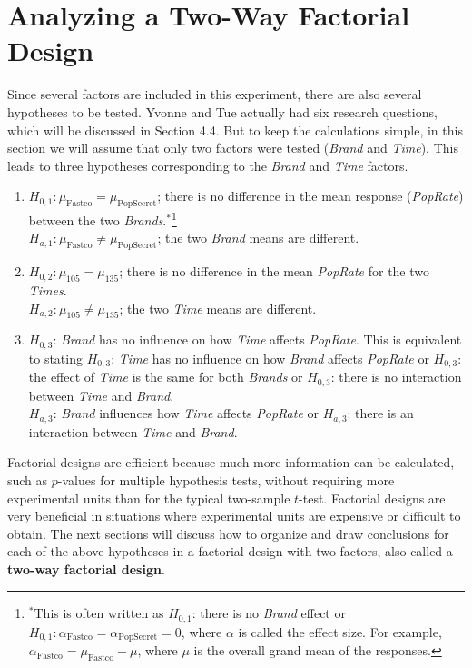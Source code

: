 \documentclass[
]{book}
\begin{document}
\hypertarget{analyzing-a-two-way-factorial-design}{%
\section{Analyzing a Two-Way Factorial Design}\label{analyzing-a-two-way-factorial-design}}

Since several factors are included in this experiment, there are also several hypotheses to be tested. Yvonne and Tue actually had six research questions, which will be discussed in Section 4.4. But to keep the calculations simple, in this section we will assume that only two factors were tested (\emph{Brand} and \emph{Time}). This leads to three hypotheses corresponding to the \emph{Brand} and \emph{Time} factors.

\begin{enumerate}
\def\labelenumi{\arabic{enumi}.}
\item
  \(H_{0,1}: \mu_{\text{Fastco}} = \mu_{\text{PopSecret}}\); there is no difference in the mean response (\emph{PopRate}) between the two \emph{Brands}.\(^*\)\footnote{\(^*\)This is often written as \(H_{0,1}\): there is no \emph{Brand} effect or \(H_{0,1}: \alpha_{\text{Fastco}} = \alpha_{\text{PopSecret}} = 0\), where \(\alpha\) is called the effect size. For example, \(\alpha_{\text{Fastco}} = \mu_{\text{Fastco}} - \mu\), where \(\mu\) is the overall grand mean of the responses.}\\
  \(H_{a,1}: \mu_{\text{Fastco}} \ne \mu_{\text{PopSecret}}\); the two \emph{Brand} means are different.
\item
  \(H_{0,2}: \mu_{105} = \mu_{135}\); there is no difference in the mean \emph{PopRate} for the two \emph{Times}.\\
  \(H_{a,2}: \mu_{105} \ne \mu_{135}\); the two \emph{Time} means are different.
\item
  \(H_{0,3}\): \emph{Brand} has no influence on how \emph{Time} affects \emph{PopRate}. This is equivalent to stating \(H_{0,3}\): \emph{Time} has no influence on how \emph{Brand} affects \emph{PopRate} or \(H_{0,3}\): the effect of \emph{Time} is the same for both \emph{Brands} or \(H_{0,3}\): there is no interaction between \emph{Time} and \emph{Brand}.\\
  \(H_{a,3}\): \emph{Brand} influences how \emph{Time} affects \emph{PopRate} or \(H_{a,3}\): there is an interaction between \emph{Time} and \emph{Brand}.
\end{enumerate}

Factorial designs are efficient because much more information can be calculated, such as \(p\)-values for multiple hypothesis tests, without requiring more experimental units than for the typical two-sample \(t\)-test. Factorial designs are very beneficial in situations where experimental units are expensive or difficult to obtain. The next sections will discuss how to organize and draw conclusions for each of the above hypotheses in a factorial design with two factors, also called a \textbf{two-way factorial design}.
\end{document}
